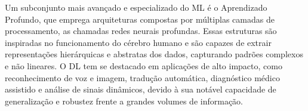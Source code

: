 %
%
%

Um subconjunto mais avançado e especializado do ML é o Aprendizado Profundo, que emprega arquiteturas compostas por múltiplas camadas de processamento, as chamadas redes neurais profundas. Essas estruturas são inspiradas no funcionamento do cérebro humano e são capazes de extrair representações hierárquicas e abstratas dos dados, capturando padrões complexos e não lineares. O DL tem se destacado em aplicações de alto impacto, como reconhecimento de voz e imagem, tradução automática, diagnóstico médico assistido e análise de sinais dinâmicos, devido à sua notável capacidade de generalização e robustez frente a grandes volumes de informação.

